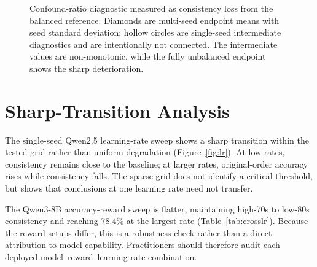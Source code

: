 \documentclass[letterpaper]{article}
\begin{document}
\begin{figure}[H]
\centering
{}
\caption{Confound-ratio diagnostic measured as consistency loss from the balanced reference. Diamonds are multi-seed endpoint means with seed standard deviation; hollow circles are single-seed intermediate diagnostics and are intentionally not connected. The intermediate values are non-monotonic, while the fully unbalanced endpoint shows the sharp deterioration.}
\label{fig:dose}
\end{figure}

\section{Sharp-Transition Analysis}
\label{app:threshold}

The single-seed Qwen2.5 learning-rate sweep shows a sharp transition within the tested grid rather than uniform degradation (Figure~\ref{fig:lr}). At low rates, consistency remains close to the baseline; at larger rates, original-order accuracy rises while consistency falls. The sparse grid does not identify a critical threshold, but shows that conclusions at one learning rate need not transfer.

The Qwen3-8B accuracy-reward sweep is flatter, maintaining high-70s to low-80s consistency and reaching 78.4\% at the largest rate (Table~\ref{tab:crosslr}). Because the reward setups differ, this is a robustness check rather than a direct attribution to model capability. Practitioners should therefore audit each deployed model--reward--learning-rate combination.


\end{document}
